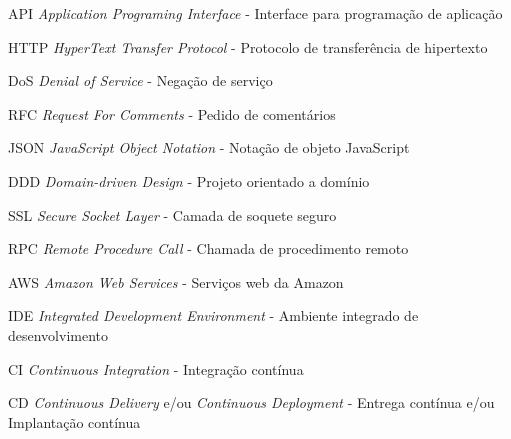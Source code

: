 
\begin{siglas}
	\item[API]{\emph{Application Programing Interface} - Interface para programação de aplicação}
	\item[HTTP]{\emph{HyperText Transfer Protocol} - Protocolo de transferência de hipertexto}
	\item[DoS]{\emph{Denial of Service} - Negação de serviço}
	\item[RFC]{\emph{Request For Comments} - Pedido de comentários}
	\item[JSON]{\emph{JavaScript Object Notation} - Notação de objeto JavaScript}
	\item[DDD]{\emph{Domain-driven Design} - Projeto orientado a domínio}
	\item[SSL]{\emph{Secure Socket Layer} - Camada de soquete seguro}
	\item[RPC]{\emph{Remote Procedure Call} - Chamada de procedimento remoto} 
	\item[AWS]{\emph{Amazon Web Services} - Serviços web da Amazon} 
	\item[IDE]{\emph{Integrated Development Environment} - Ambiente integrado de desenvolvimento} 
	\item[CI]{\emph{Continuous Integration} - Integração contínua}
	\item[CD]{\emph{Continuous Delivery} e/ou \emph{Continuous Deployment} - Entrega contínua e/ou Implantação contínua}
\end{siglas}